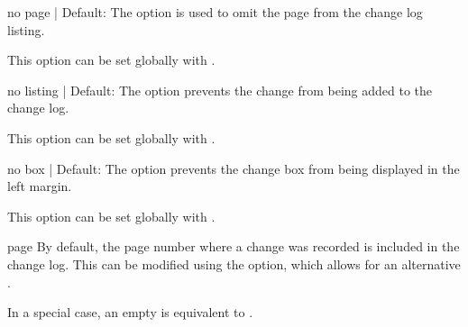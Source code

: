 \documentclass[11pt, outdir = ./out]{article}
\begin{document}
\begin{DocsListing}
\end{DocsListing}


\begin{Optiondef}{no page}{ | }{Default: }
    The  option is used to omit the page from the change log listing.

    This option can be set globally with .
\end{Optiondef}

\begin{DocsListing}
\end{DocsListing}


\begin{Optiondef}{no listing}{ | }{Default: }
    The  option prevents the change from being added to the change log.

    This option can be set globally with .
\end{Optiondef}

\begin{DocsListing}
\end{DocsListing}

\begin{Optiondef}{no box}{ | }{Default: }
    The  option prevents the change box from being displayed in the left margin.

    This option can be set globally with .
\end{Optiondef}

\begin{Optiondef}{page}{}{}
    By default, the page number where a change was recorded is included in the change log. This can be modified using the  option, which allows for an alternative .

    In a special case, an empty  is equivalent to .
\end{Optiondef}
\end{document}
